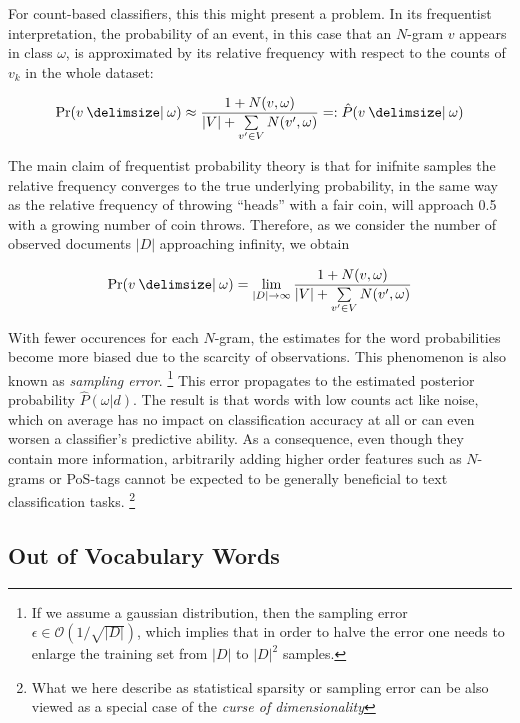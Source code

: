 For count-based classifiers, this this might present a problem. In its
frequentist interpretation, the probability of an event, in this case that an
$N$-gram $v$ appears in class $\omega$, is approximated by
its relative frequency with respect to the counts of $v_k$ in the whole dataset:

\begin{equation*}
\Pr(v \given \omega) \approx \frac{1 + N(v,\omega)
}{|V| + \sum\limits_{v'\in V} N(v',\omega)} =:
\hat{P}(v \given \omega)
\end{equation*}

The main claim of frequentist probability theory is that for inifnite samples
the relative frequency converges to the true underlying probability, in the same
way as the relative frequency of throwing ``heads'' with a fair coin, will
approach 0.5 with a growing number of coin throws. Therefore, as we consider the
number of observed documents $|D|$ approaching infinity, we obtain

\begin{equation*}
\Pr(v \given \omega) = \lim_{|D| \to \infty} \frac{1 + N(v,\omega)
}{|V| + \sum\limits_{v'\in V} N(v',\omega)}
\end{equation*}

With fewer occurences for each $N$-gram, the estimates for the word probabilities
become more biased due to the scarcity of observations. This phenomenon is also
known as \emph{sampling error}. \footnote{If we assume a
gaussian distribution, then the sampling error $\epsilon \in
\mathcal{O}(1/\sqrt{|D|})$, which implies that in order to halve the error one
needs to enlarge the training set from $|D|$ to $|D|^2$ samples.} This error
propagates to the estimated posterior probability $\hat{P}(\omega|d)$.
The result is that words with low counts act like noise, which on average has no
impact on classification accuracy at all or can even worsen a classifier's
predictive ability. As a consequence, even though they contain more
information, arbitrarily adding higher order features such as $N$-grams or
PoS-tags cannot be expected to be generally beneficial to text classification
tasks. \footnote{What we here describe as statistical sparsity or sampling
error can be also viewed as a special case of the \emph{curse of
dimensionality}}

\subsection{Out of Vocabulary Words}
\label{ssec:oov}


